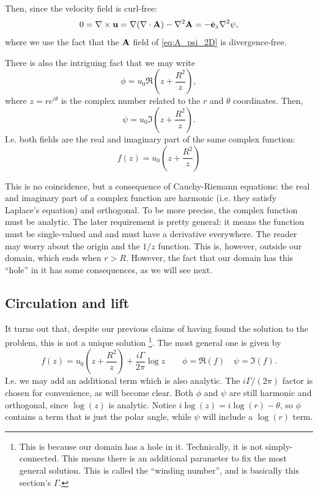 Then, since the velocity field is curl-free:
\begin{equation}
  \label{eq:if_no_curl_then_stream_harmonic}
  0 = \nabla \times \mathbf{u} =
  \nabla (\nabla \cdot \mathbf {A} )- \nabla^{2}\mathbf {A} =
  - \hat{\mathbf{e}}_z \nabla^{2} \psi,
\end{equation}
where we use the fact that the $\mathbf{A}$ field of \ref{eq:A_psi_2D} is
divergence-free.


There is also the intriguing fact that we may write
\[
\phi = u_0 \Re \left( z  + \frac{R^2}{z} \right) ,
\]
where $z=r e^{i\theta}$ is the complex number related to the $r$ and
$\theta$ coordinates. Then,
\[
\psi = u_0 \Im \left( z  + \frac{R^2}{z} \right) .
\]
%
I.e. both fields are the real and imaginary part of the same complex
function:
\[
f(z) = u_0 \left( z  + \frac{R^2}{z} \right)
\]

This is no coincidence, but a consequence of Cauchy-Riemann
equations: the real and imaginary part of a complex function are
harmonic (i.e. they satisfy Laplace's equation) and orthogonal. To be
more precise, the complex function must be analytic. The later
requirement is pretty general: it means the function must be
single-valued and and must have a derivative everywhere. The reader
may worry about the origin and the $1/z$ function. This is, however,
outside our domain, which ends when $r>R$. However, the fact that our
domain has this ``hole'' in it has some consequences, as we will see
next.


\subsection{Circulation and lift}

It turns out that, despite our previous claims of having found the
solution to the problem, this is not a unique solution%
\footnote{This is because our domain has a hole in it. Technically, it
  is not simply-connected. This means there is an additional parameter
  to fix the most general solution. This is called the ``winding
  number'', and is basically this section's $\Gamma$.}.
%
The most general one is given by
\[
 f(z) = u_0 \left( z + \frac{R^2}{z} \right)
 + \frac{i \Gamma}{2\pi} \log z \qquad
 \phi=\Re(f) \quad
 \psi=\Im(f) .
\]
I.e. we may add an additional term which is also analytic. The $i
\Gamma/(2\pi)$ factor is chosen for convenience, as will become
clear. Both $\phi$ and $\psi$ are still harmonic and orthogonal, since
$\log(z)$ is analytic. Notice $i \log(z)= i \log(r) - \theta$, so
$\phi$ contains a term that is just the polar angle, while $\psi$ will
include a $\log(r)$ term.

